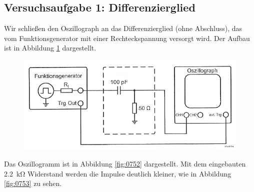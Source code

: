 \FloatBarrier
\subsection{Versuchsaufgabe 1: Differenzierglied}

Wir schließen den Oszillograph an das Differenzierglied (ohne Abschluss), das
vom Funktionsgenerator mit einer Rechteckspannung versorgt wird. Der Aufbau ist
in Abbildung \ref{fig:1-6} dargestellt.

\begin{figure}
	\centering
	\includegraphics[width=\textwidth]{Schaltplan/1-6.png}
	\caption{%
		\cite[Abbildung~1.6]{physik313-Anleitung}
	}
	\label{fig:1-6}
\end{figure}

Das
Oszillogramm ist in Abbildung \ref{fig:0752} dargestellt. Mit dem eingebauten
\SI{2.2}{\kilo\ohm} Widerstand werden die Impulse deutlich kleiner, wie in
Abbildung \ref{fig:0753} zu sehen.


